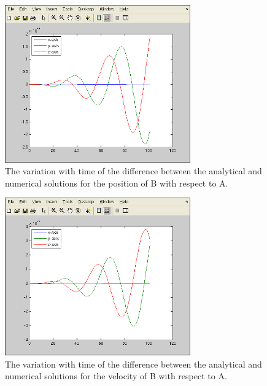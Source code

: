 \begin{description}
\begin{figure}[!ht]
  \begin{center}
        \includegraphics[width=80mm]{figures/relative7_xba.png}
        \caption{The variation with time of the difference between the analytical and numerical solutions for the position of B with respect to A.} 
  \end{center}
\end{figure}

 \begin{figure}[!ht]
  \begin{center}
        \includegraphics[width=80mm]{figures/relative7_vba.png}
        \caption{The variation with time of the difference between the analytical and numerical solutions for the velocity of B with respect to A.} 
  \end{center}
\end{figure}


\end{description}

